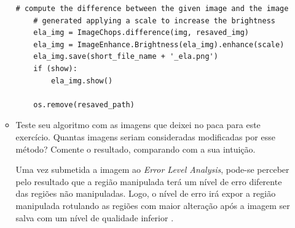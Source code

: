 \documentclass[12pt]{article}
\begin{document}
\begin{itemize}
\begin{itemize}
\begin{lstlisting}[basicstyle=\ttfamily]
    # compute the difference between the given image and the image
    # generated applying a scale to increase the brightness
    ela_img = ImageChops.difference(img, resaved_img)
    ela_img = ImageEnhance.Brightness(ela_img).enhance(scale)
    ela_img.save(short_file_name + '_ela.png')
    if (show):
        ela_img.show()
    
    os.remove(resaved_path)
\end{lstlisting}

\item Teste seu algoritmo com as imagens que deixei no paca para este exercício. 
Quantas imagens seriam consideradas modificadas por esse método? Comente o resultado,
comparando com a sua intuição.

Uma vez submetida a imagem ao \textit{Error Level Analysis}, pode-se perceber pelo resultado que 
a região manipulada terá um nível de erro diferente das regiões não manipuladas. Logo, 
o nível de erro irá expor a região manipulada rotulando as regiões com maior alteração após
a imagem ser salva com um nível de qualidade inferior \cite{krawetz}.


\end{itemize}
\end{itemize}
\end{document}
